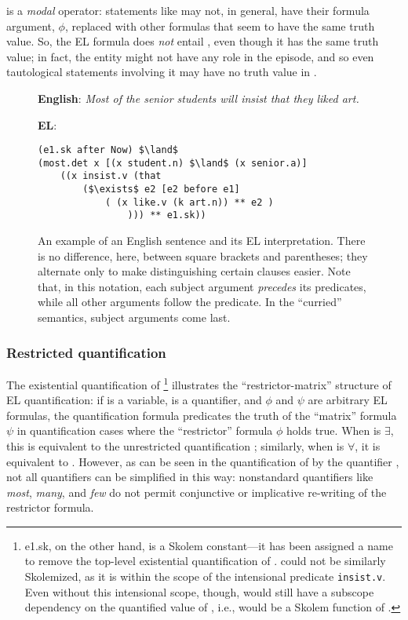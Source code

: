 \el{**} is a \textit{modal} operator: statements like \el{[$\phi$ ** e]} may not, in general, have their formula argument, $\phi$, replaced with other formulas that seem to have the same truth value. So, the EL formula  does \textit{not} entail , even though it has the same truth value; in fact, the entity  might not have any role in the episode, and so even tautological statements involving it may have no truth value in .

\begin{figure}

\textbf{English}: \textit{Most of the senior students will insist that they liked art.}

\textbf{EL}: \begin{lstlisting}[xleftmargin=4.5em,style=EL,mathescape=true]
(e1.sk after Now) $\land$
(most.det x [(x student.n) $\land$ (x senior.a)]
    ((x insist.v (that 
        ($\exists$ e2 [e2 before e1]
            ( (x like.v (k art.n)) ** e2 )
                ))) ** e1.sk))
\end{lstlisting}
    \caption{An example of an English sentence and its EL interpretation. There is no difference, here, between square brackets and parentheses; they alternate only to make distinguishing certain clauses easier. Note that, in this notation, each subject argument \textit{precedes} its predicates, while all other arguments follow the predicate. In the ``curried'' semantics, subject arguments come last.}
    \label{fig:eng_el_pair}
\end{figure}

\subsubsection{Restricted quantification}
The existential quantification of \footnote{e1.sk, on the other hand, is a Skolem constant---it has been assigned a name to remove the top-level existential quantification of . could not be similarly Skolemized, as it is within the scope of the intensional predicate \texttt{insist.v}. Even without this intensional scope, though,  would still have a subscope dependency on the quantified value of , i.e.,  would be a Skolem function of .} illustrates the ``restrictor-matrix'' structure of EL quantification: if  is a variable,  is a quantifier, and $\phi$ and $\psi$ are arbitrary EL formulas, the quantification formula  predicates the truth of the ``matrix'' formula $\psi$ in quantification cases where the ``restrictor'' formula $\phi$ holds true. When  is $\exists$, this is equivalent to the unrestricted quantification ; similarly, when  is $\forall$, it is equivalent to . However, as can be seen in the quantification of  by the quantifier , not all quantifiers can be simplified in this way: nonstandard quantifiers like \textit{most}, \textit{many}, and \textit{few} do not permit conjunctive or implicative re-writing of the restrictor formula.

